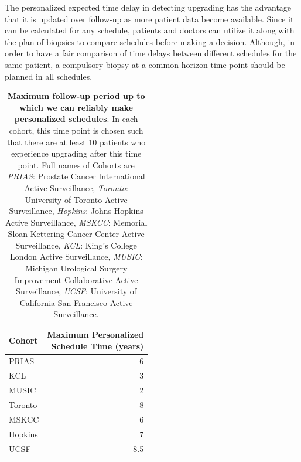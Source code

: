 The personalized expected time delay in detecting upgrading has the advantage that it is updated over follow-up as more patient data become available. Since it can be calculated for any schedule, patients and doctors can utilize it along with the plan of biopsies to compare schedules before making a decision. Although, in order to have a fair comparison of time delays between different schedules for the same patient, a compulsory biopsy at a common horizon time point should be planned in all schedules.

\begin{table}[!htb]
\small\sf\centering
\caption{\textbf{Maximum follow-up period up to which we can reliably make personalized schedules}. In each cohort, this time point is chosen such that there are at least 10 patients who experience upgrading after this time point. Full names of Cohorts are \textit{PRIAS}: Prostate Cancer International Active Surveillance, \textit{Toronto}: University of Toronto Active Surveillance, \textit{Hopkins}: Johns Hopkins Active Surveillance, \textit{MSKCC}: Memorial Sloan Kettering Cancer Center Active Surveillance, \textit{KCL}: King's College London Active Surveillance, \textit{MUSIC}: Michigan Urological Surgery Improvement Collaborative Active Surveillance, \textit{UCSF}: University of California San Francisco Active Surveillance.}
\label{tab:max_pred_time_repeat}
\begin{tabular}{l|r}
\hline
\hline
Cohort & \parbox[t]{3.75cm}{Maximum Personalized\\Schedule Time (years)}\\
\hline
PRIAS & 6\\
KCL & 3\\
MUSIC & 2\\
Toronto & 8\\
MSKCC & 6\\
Hopkins & 7\\
UCSF & 8.5\\
\hline
\end{tabular}    
\end{table}

